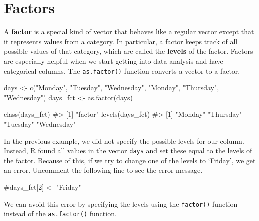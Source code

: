 \documentclass[
  letterpaper,
]{latex/krantz}
\makeatletter
\newenvironment{Shaded}{\begin{snugshade}}{\end{snugshade}}
\newcommand{\CommentTok}[1]{\textcolor[rgb]{0.37,0.37,0.37}{#1}}
\newcommand{\FunctionTok}[1]{\textcolor[rgb]{0.28,0.35,0.67}{#1}}
\newcommand{\NormalTok}[1]{\textcolor[rgb]{0.00,0.23,0.31}{#1}}
\newcommand{\OtherTok}[1]{\textcolor[rgb]{0.00,0.23,0.31}{#1}}
\newcommand{\StringTok}[1]{\textcolor[rgb]{0.13,0.47,0.30}{#1}}
\newenvironment{kframe}{%
\medskip{}
\setlength{\fboxsep}{.8em}
 \def\at@end@of@kframe{}%
 \ifinner\ifhmode%
  \def\at@end@of@kframe{\end{minipage}}%
  \begin{minipage}{\columnwidth}%
 \fi\fi%
 \def\FrameCommand##1{\hskip\@totalleftmargin \hskip-\fboxsep
 \colorbox{shadecolor}{##1}\hskip-\fboxsep
     \hskip-\linewidth \hskip-\@totalleftmargin \hskip\columnwidth}%
 \MakeFramed {\advance\hsize-\width
   \@totalleftmargin\z@ \linewidth\hsize
   \@setminipage}}%
 {\par\unskip\endMakeFramed%
 \at@end@of@kframe}
\renewenvironment{Shaded}{\begin{kframe}}{\end{kframe}}
\makeatother
\begin{document}
\section{\texorpdfstring{Factors
}{Factors }}\label{factors}

A \textbf{factor} is a special kind of vector that behaves like a
regular vector except that it represents values from a category. In
particular, a factor keeps track of all possible values of that
category, which are called the \textbf{levels} of
the factor. Factors are especially helpful when we start getting into
data analysis and have categorical columns. The
\texttt{as.factor()}
function converts a vector to a factor.

\begin{Shaded}
\begin{Highlighting}[]
\NormalTok{days }\OtherTok{\textless{}{-}} \FunctionTok{c}\NormalTok{(}\StringTok{"Monday"}\NormalTok{, }\StringTok{"Tuesday"}\NormalTok{, }\StringTok{"Wednesday"}\NormalTok{, }\StringTok{"Monday"}\NormalTok{, }
          \StringTok{"Thursday"}\NormalTok{, }\StringTok{"Wednesday"}\NormalTok{)}
\NormalTok{days\_fct }\OtherTok{\textless{}{-}} \FunctionTok{as.factor}\NormalTok{(days)}

\FunctionTok{class}\NormalTok{(days\_fct)}
\CommentTok{\#\textgreater{} [1] "factor"}
\FunctionTok{levels}\NormalTok{(days\_fct)}
\CommentTok{\#\textgreater{} [1] "Monday"    "Thursday"  "Tuesday"   "Wednesday"}
\end{Highlighting}
\end{Shaded}

In the previous example, we did not specify the possible levels for our
column. Instead, R found all values in the vector \texttt{days} and set
these equal to the levels of the factor. Because of this, if we try to
change one of the levels to `Friday', we get an error. Uncomment the
following line to see the error message.

\begin{Shaded}
\begin{Highlighting}[]
\CommentTok{\#days\_fct[2] \textless{}{-} "Friday"   }
\end{Highlighting}
\end{Shaded}

We can avoid this error by specifying the levels using the
\texttt{factor()} function
instead of the \texttt{as.factor()} function.
\end{document}
